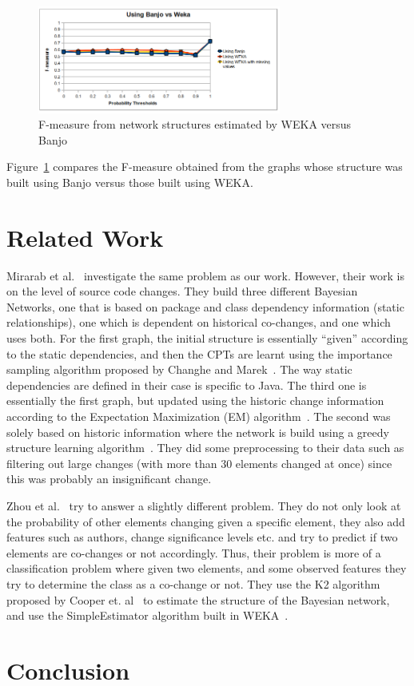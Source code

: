 \documentclass{article}
\begin{document}
\begin{figure}[!t]
\centering
\includegraphics[width=8cm]{graphics/banjowekares.png}
\caption{F-measure from network structures estimated by WEKA versus Banjo}
\label{fig:wekabnj}
\end{figure}

Figure~\ref{fig:wekabnj} compares the F-measure obtained from the graphs whose structure was built using Banjo versus those built using WEKA.

\section{Related Work}
\label{rel-work}

Mirarab et al.~\cite{mirarab2007} investigate the same problem as our work. However, their work is on the level of source code changes. They build three
different Bayesian Networks, one that is based on package and class dependency information (static relationships), one which is dependent on historical
co-changes, and one which uses both. For the first graph, the initial structure is essentially ``given'' according to the static dependencies, and then the CPTs
are learnt using the importance sampling algorithm proposed by Changhe and Marek~\cite{yuan2003importance}. The way static dependencies are defined in their
case is specific to Java. The third one is essentially the first graph, but updated using the historic change information according to the Expectation
Maximization (EM) algorithm~\cite{dempster1977maximum}. The second was solely based on historic information where the network is build using a greedy structure
 learning algorithm~\cite{friedman1996learning}. They did some preprocessing to their data such as filtering out large changes (with more than 30 elements
changed at once) since this was probably an insignificant change.

Zhou et al.~\cite{zhou2008} try to answer a slightly different problem. They do not only look at the probability of other elements changing given a specific
element, they also add features such as authors, change significance levels etc. and try to predict if two elements are co-changes or not accordingly. Thus,
their problem is more of a classification problem where given two elements, and some observed features they try to determine the class as a co-change or not.
They use the K2 algorithm proposed by Cooper et. al~\cite{cooper1992bayesian} to estimate the structure of the Bayesian network, and use the SimpleEstimator
algorithm built in WEKA~\cite{witten2005data}.


\section{Conclusion}
\label{concl}




\end{document}

